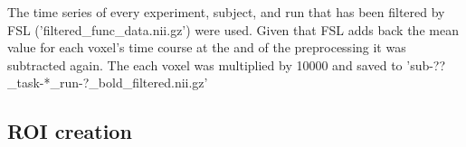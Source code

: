 {




%
The time series of every experiment, subject, and run that has been filtered
by FSL ('filtered\_func\_data.nii.gz') were used.
%
Given that FSL adds back the mean value for each voxel's time course at the
and of the preprocessing it was subtracted again.
%
The each voxel was multiplied by 10000%
and saved to 'sub-??\_task-*\_run-?\_bold\_filtered.nii.gz'

\subsection{ROI creation}







}
